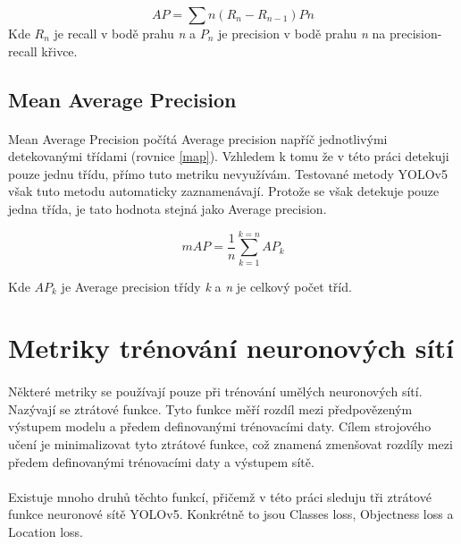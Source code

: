  \begin{equation}\label{AP}
A P=\sum n(R_n-R_{n-1}) P n
\end{equation}
Kde \begin{math}R_n\end{math} je recall v bodě prahu \textit{n} a \begin{math}P_n\end{math} je precision v bodě prahu \textit{n} na precision-recall křivce.

\subsection*{Mean Average Precision}
\paragraph{} Mean Average Precision \cite{ap} počítá Average precision napříč jednotlivými detekovanými třídami (rovnice \ref{map}). Vzhledem k tomu že v této práci detekuji pouze jednu třídu, přímo tuto metriku nevyužívám. Testované metody YOLOv5 však tuto metodu automaticky zaznamenávají. Protože se však detekuje pouze jedna třída, je tato hodnota stejná jako Average precision.

\begin{equation}\label{map}
m A P=\frac{1}{n} \sum_{k=1}^{k=n} A P_k
\end{equation}

Kde \begin{math}AP_k\end{math} je Average precision třídy \textit{k} a \textit{n} je celkový počet tříd.
\section*{Metriky trénování neuronových sítí}
\paragraph{} Některé metriky se používají pouze při trénování umělých neuronových sítí. Nazývají se ztrátové funkce. Tyto funkce měří rozdíl mezi předpovězeným výstupem modelu a předem definovanými trénovacími daty. Cílem strojového učení je minimalizovat tyto ztrátové funkce, což znamená zmenšovat rozdíly mezi předem definovanými trénovacími daty a výstupem sítě.
\paragraph{} Existuje mnoho druhů těchto funkcí, přičemž v této práci sleduju tři ztrátové funkce neuronové sítě YOLOv5. Konkrétně to jsou Classes loss, Objectness loss a Location loss\cite{ultralytics}.

